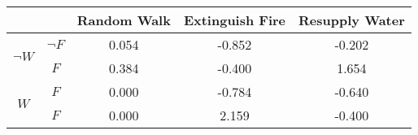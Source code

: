 \begin{center}
\begin{tabular}{|c|c|c|c|c|}
  \hline
  &   & Random Walk & Extinguish Fire & Resupply Water\\
  \hline
  \multirow{2}{*}{$\neg W$} & $\neg F$ & 0.054 & -0.852 & -0.202\\
  \cline{2-5}
   & $F$ & 0.384 & -0.400 & 1.654\\
  \hline
  \multirow{2}{*}{$W$} & $F$ & 0.000 & -0.784 & -0.640\\
  \cline{2-5}
   & $F$ & 0.000 & 2.159 & -0.400\\
  \hline
\end{tabular}
\end{center}
